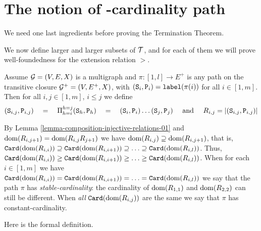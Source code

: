 \documentclass{lmcs}
\begin{document}
\section{The notion of 
-cardinality path}
We need one last ingredients before proving the Termination Theorem.

We now define larger and larger subsets of ${\mathcal T}$, and for each of them 
we will prove well-foundedness for the extension relation $>$.

Assume ${\mathcal G}=(V,E,X)$ is a multigraph and $\pi:[1,l] \rightarrow E^+$ 
is any path on the transitive closure ${\mathcal G}^+=(V,E^+,X)$,
with $({\tt S}_i,{\tt P}_i) = {\tt label}(\pi(i))$ for all $i \in[1,m]$.
Then for all $i,j \in[1,m]$, $i \le j$ we define
$$
({\tt S}_{i,j},{\tt P}_{i,j}) \ \ \ = \ \ \
\Pi_{h=i}^{h=j} ({\tt S}_h,{\tt P}_h) \ \ \ = \ \ \
({\tt S}_i,{\tt P}_i) \ldots ({\tt S}_j,{\tt P}_j)
\mbox{ \ \ \ and \ \ \ }
R_{i,j} = {| ({\tt S}_{i,j},{\tt P}_{i,j}) |}
$$

By Lemma \ref{lemma-composition-injective-relations-01} 
and ${\rm dom}(R_{i,j+1}) = {\rm dom}(R_{i,j} R_{j+1})$ we have
${\rm dom}(R_{i,j})  \supseteq {\rm dom}(R_{i,j+1})$, that is,
${\tt Card}({\rm dom}(R_{i,i})) \supseteq {\tt Card}({\rm dom}(R_{i,i+1}))
\supseteq \ldots \supseteq {\tt Card}({\rm dom}(R_{i,l}))$. Thus, 
${\tt Card}({\rm dom}(R_{i,i})) \ge {\tt Card}({\rm dom}(R_{i,i+1})) \ge \ldots \ge {\tt Card}({\rm dom}(R_{i,l}))$.
When for each $i \in[1,m]$  we have 
${\tt Card}({\rm dom}(R_{i,i})) = {\tt Card}({\rm dom}(R_{i,i+1})) = \ldots = {\tt Card}({\rm dom}(R_{i,l}))$ 
we say that the path $\pi$ has \emph{stable-cardinality}: the cardinality
of ${\rm dom}(R_{1,1})$ and ${\rm dom}(R_{2,2})$ can still be different.
When \emph{all} ${\tt Card}({\rm dom}(R_{i,j}))$ are the same we
say that $\pi$ has constant-cardinality.

Here is the formal definition.
\end{document}
